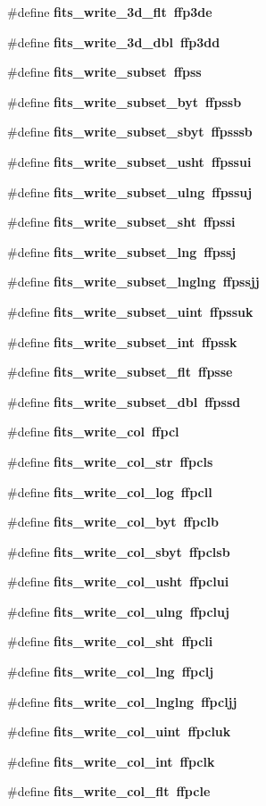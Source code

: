 \begin{CompactItemize}
\item 
\#define \bf{fits\_\-write\_\-3d\_\-flt}~ffp3de
\item 
\#define \bf{fits\_\-write\_\-3d\_\-dbl}~ffp3dd
\item 
\#define \bf{fits\_\-write\_\-subset}~ffpss
\item 
\#define \bf{fits\_\-write\_\-subset\_\-byt}~ffpssb
\item 
\#define \bf{fits\_\-write\_\-subset\_\-sbyt}~ffpsssb
\item 
\#define \bf{fits\_\-write\_\-subset\_\-usht}~ffpssui
\item 
\#define \bf{fits\_\-write\_\-subset\_\-ulng}~ffpssuj
\item 
\#define \bf{fits\_\-write\_\-subset\_\-sht}~ffpssi
\item 
\#define \bf{fits\_\-write\_\-subset\_\-lng}~ffpssj
\item 
\#define \bf{fits\_\-write\_\-subset\_\-lnglng}~ffpssjj
\item 
\#define \bf{fits\_\-write\_\-subset\_\-uint}~ffpssuk
\item 
\#define \bf{fits\_\-write\_\-subset\_\-int}~ffpssk
\item 
\#define \bf{fits\_\-write\_\-subset\_\-flt}~ffpsse
\item 
\#define \bf{fits\_\-write\_\-subset\_\-dbl}~ffpssd
\item 
\#define \bf{fits\_\-write\_\-col}~ffpcl
\item 
\#define \bf{fits\_\-write\_\-col\_\-str}~ffpcls
\item 
\#define \bf{fits\_\-write\_\-col\_\-log}~ffpcll
\item 
\#define \bf{fits\_\-write\_\-col\_\-byt}~ffpclb
\item 
\#define \bf{fits\_\-write\_\-col\_\-sbyt}~ffpclsb
\item 
\#define \bf{fits\_\-write\_\-col\_\-usht}~ffpclui
\item 
\#define \bf{fits\_\-write\_\-col\_\-ulng}~ffpcluj
\item 
\#define \bf{fits\_\-write\_\-col\_\-sht}~ffpcli
\item 
\#define \bf{fits\_\-write\_\-col\_\-lng}~ffpclj
\item 
\#define \bf{fits\_\-write\_\-col\_\-lnglng}~ffpcljj
\item 
\#define \bf{fits\_\-write\_\-col\_\-uint}~ffpcluk
\item 
\#define \bf{fits\_\-write\_\-col\_\-int}~ffpclk
\item 
\#define \bf{fits\_\-write\_\-col\_\-flt}~ffpcle

\end{CompactItemize}
